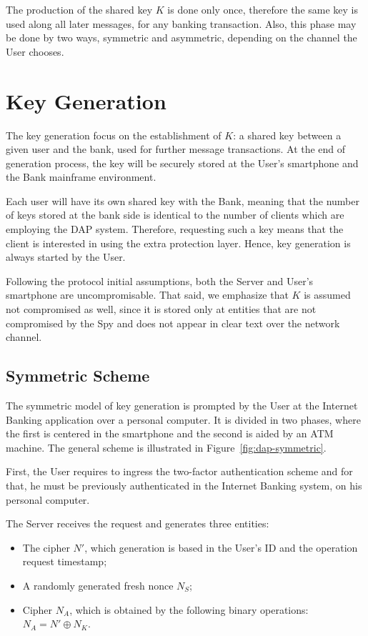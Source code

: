 The production of the shared key \(K\) is done only once, therefore the same key is used along all later messages, for any banking transaction. Also, this phase may be done by two ways, symmetric and asymmetric, depending on the channel the User chooses.





\section{Key Generation}
The key generation focus on the establishment of \(K\): a shared key between a given user and the bank, used for further message transactions. At the end of generation process, the key will be securely stored at the User's smartphone and the Bank mainframe environment.

Each user will have its own shared key with the Bank, meaning that the number of keys stored at the bank side is identical to the number of clients which are employing the DAP system. Therefore, requesting such a key means that the client is interested in using the extra protection layer. Hence, key generation is always started by the User.

Following the protocol initial assumptions, both the Server and User's smartphone are uncompromisable. That said, we emphasize that \(K\) is assumed not compromised as well, since it is stored only at entities that are not compromised by the Spy and does not appear in clear text over the network channel.



\subsection{Symmetric Scheme}
The symmetric model of key generation is prompted by the User at the Internet Banking application over a personal computer. It is divided in two phases, where the first is centered in the smartphone and the second is aided by an ATM machine. The general scheme is illustrated in Figure~\ref{fig:dap-symmetric}.

First, the User requires to ingress the two-factor authentication scheme and for that, he must be previously authenticated in the Internet Banking system, on his personal computer.

The Server receives the request and generates three entities:
\begin{itemize}
  \item The cipher \(N'\), which generation is based in the User's ID and the operation request timestamp;

  \item A randomly generated fresh nonce \(N_S\);

  \item Cipher \(N_A\), which is obtained by the following binary operations: \(N_A = N' \oplus N_K\).
\end{itemize}

